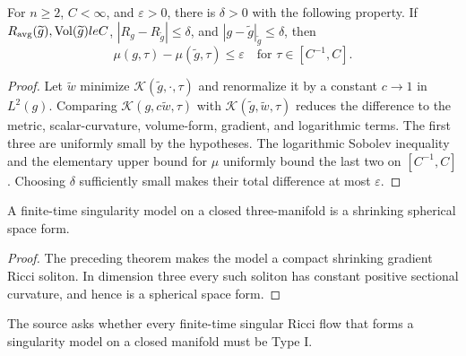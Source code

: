 \begin{lemma}
\label{lem:chow-iii-ch17-mu-continuity}
For $n\ge2$, $C<\infty$, and $\varepsilon>0$, there is $\delta>0$ with
the following property.  If $R_{\rm avg}(\widetilde g),\operatorname{Vol}(\widetilde g)le C$,
$|R_g-R_{\widetilde g}|\le\delta$, and
$|g-\widetilde g|_{\widetilde g}\le\delta$, then
\[
 \mu(g,\tau)-\mu(\widetilde g,\tau)\le\varepsilon
 \quad\text{for }\tau\in[C^{-1},C].
\]
\end{lemma}
\begin{proof}
Let $\widetilde w$ minimize $\mathcal K(\widetilde g,\cdot,\tau)$ and
renormalize it by a constant $c\to1$ in $L^2(g)$.  Comparing
$\mathcal K(g,c\widetilde w,\tau)$ with
$\mathcal K(\widetilde g,\widetilde w,\tau)$ reduces the difference to the
metric, scalar-curvature, volume-form, gradient, and logarithmic terms.
The first three are uniformly small by the hypotheses.  The logarithmic
Sobolev inequality and the elementary upper bound for $\mu$ uniformly bound
the last two on $[C^{-1},C]$.  Choosing $\delta$ sufficiently small makes
their total difference at most $\varepsilon$.
\end{proof}

\begin{corollary}
\label{cor:chow-iii-ch17-closed-three-model-round}
A finite-time singularity model on a closed three-manifold is a shrinking
spherical space form.
\end{corollary}
\begin{proof}
The preceding theorem makes the model a compact shrinking gradient Ricci
soliton.  In dimension three every such soliton has constant positive
sectional curvature, and hence is a spherical space form.
\end{proof}

\begin{remark}
\label{rem:chow-iii-ch17-compact-model-type-i-problem}
The source asks whether every finite-time singular Ricci flow that forms a
singularity model on a closed manifold must be Type I.
\end{remark}

